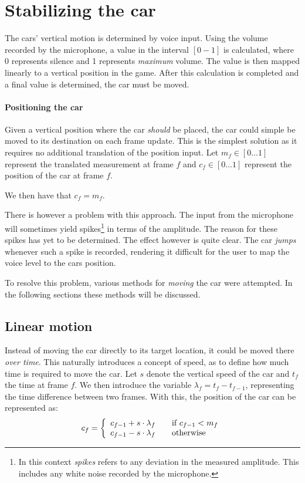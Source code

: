 \section{Stabilizing the car}
The cars' vertical motion is determined by voice input.
Using the volume recorded by the microphone, a value in the interval $[0-1]$ is calculated, where 0 represents silence and 1 represents \textit{maximum} volume.
The value is then mapped linearly to a vertical position in the game.
After this calculation is completed and a final value is determined, the car must be moved.

\paragraph{Positioning the car}
Given a vertical position where the car \textit{should} be placed, the car could simple be moved to its destination on each frame update.
This is the simplest solution as it requires no additional translation of the position input.
Let $m_f \in [0 \dots 1]$ represent the translated measurement at frame $f$ and $c_f \in [0 \dots 1]$ represent the position of the car at frame $f$.

\begin{center}
We then have that $c_f = m_f$.
\end{center}

There is however a problem with this approach.
The input from the microphone will sometimes yield spikes\footnote{
In this context \textit{spikes} refers to any deviation in the measured amplitude.
This includes any white noise recorded by the microphone.} in terms of the amplitude.
The reason for these spikes has yet to be determined.
The effect however is quite clear.
The car \textit{jumps} whenever such a spike is recorded, rendering it difficult for the user to map the voice level to the cars position.

To resolve this problem, various methods for \textit{moving} the car were attempted.
In the following sections these methods will be discussed.

\subsection{Linear motion}\label{stability:linear}
Instead of moving the car directly to its target location, it could be moved there \textit{over time}.
This naturally introduces a concept of speed, as to define how much time is required to move the car.
Let $s$ denote the vertical speed of the car and $t_f$ the time at frame $f$.
We then introduce the variable $\lambda_f = t_f - t_{f-1}$, representing the time difference between two frames.
With this, the position of the car can be represented as: $$c_f = \left\{ 
  \begin{array}{l l}
    c_{f-1} + s \cdot \lambda_f & \quad \text{if $c_{f-1} < m_f$}\\
    c_{f-1} - s \cdot \lambda_f & \quad \text{otherwise}
  \end{array} \right.$$

